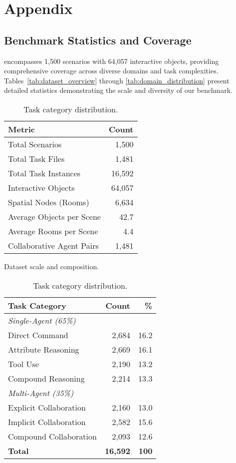 \clearpage
\section*{Appendix}

\subsection{Benchmark Statistics and Coverage}

\label{sec:dataset_statics}

\benchmark encompasses 1,500 scenarios with 64,057 interactive objects, providing comprehensive coverage across diverse domains and task complexities. Tables~\ref{tab:dataset_overview} through \ref{tab:domain_distribution} present detailed statistics demonstrating the scale and diversity of our benchmark.

\begin{table}[htbp]
\centering
\footnotesize
\begin{minipage}[t]{0.47\textwidth}
\centering
\begin{tabular}{lr}
\toprule
\textbf{Metric} & \textbf{Count} \\
\midrule
Total Scenarios & 1,500 \\
Total Task Files & 1,481 \\
Total Task Instances & 16,592 \\
Interactive Objects & 64,057 \\
Spatial Nodes (Rooms) & 6,634 \\
Average Objects per Scene & 42.7 \\
Average Rooms per Scene & 4.4 \\
Collaborative Agent Pairs & 1,481 \\
\bottomrule
\end{tabular}
\caption{Dataset scale and composition.}
\label{tab:dataset_overview}
\end{minipage}
\hfill
\begin{minipage}[t]{0.47\textwidth}
\centering
\begin{tabular}{lrr}
\toprule
\textbf{Task Category} & \textbf{Count} & \textbf{\%} \\
\midrule
\multicolumn{3}{l}{\textit{Single-Agent (65\%)}} \\
Direct Command & 2,684 & 16.2 \\
Attribute Reasoning & 2,669 & 16.1 \\
Tool Use & 2,190 & 13.2 \\
Compound Reasoning & 2,214 & 13.3 \\
\midrule
\multicolumn{3}{l}{\textit{Multi-Agent (35\%)}} \\
Explicit Collaboration & 2,160 & 13.0 \\
Implicit Collaboration & 2,582 & 15.6 \\
Compound Collaboration & 2,093 & 12.6 \\
\midrule
\textbf{Total} & \textbf{16,592} & \textbf{100} \\
\bottomrule
\end{tabular}
\caption{Task category distribution.}
\label{tab:task_distribution}
\end{minipage}
\end{table}

